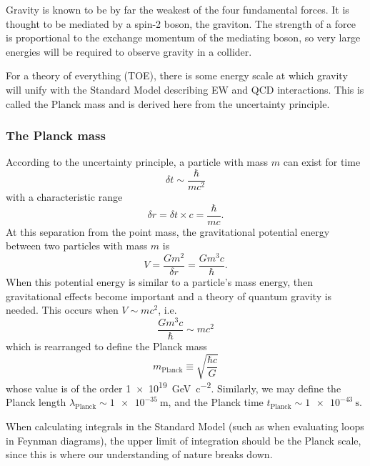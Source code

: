 \documentclass{report}
\begin{document}
Gravity is known to be by far the weakest of the four fundamental forces. It is thought to be mediated by a spin-2 boson, the graviton. The strength of a force is proportional to the exchange momentum of the mediating boson, so very large energies will be required to observe gravity in a collider.

For a theory of everything (TOE), there is some energy scale at which gravity will unify with the Standard Model describing EW and QCD interactions. This is called the Planck mass and is derived here from the uncertainty principle.

\subsubsection{The Planck mass}
According to the uncertainty principle, a particle with mass $m$ can exist for time
\begin{equation}
\delta t \sim \frac{\hbar}{mc^2}
\end{equation}
with a characteristic range
\begin{equation}
\delta r = \delta t \times c = \frac{\hbar}{mc}.
\end{equation}
At this separation from the point mass, the gravitational potential energy between two particles with mass $m$ is
\begin{equation}
V = \frac{Gm^2}{\delta r} = \frac{Gm^3c}{\hbar}.
\end{equation}
When this potential energy is similar to a particle's mass energy, then gravitational effects become important and a theory of quantum gravity is needed. This occurs when $V \sim mc^2$, i.e.~
\begin{equation}
\frac{Gm^3c}{\hbar} \sim mc^2
\end{equation}
which is rearranged to define the Planck mass
\begin{equation}\boxed{
m_\text{Planck} \equiv \sqrt{\frac{\hbar c}{G}}
}
\end{equation}
whose value is of the order \SI[retain-unity-mantissa = false]{1e19}{\giga\electronvolt\per c^2}. Similarly, we may define the Planck length $\lambda_\text{Planck} \sim \SI[retain-unity-mantissa = false]{1e-35}{\meter}$, and the Planck time $t_\text{Planck} \sim \SI[retain-unity-mantissa = false]{1e-43}{\second}$.

When calculating integrals in the Standard Model (such as when evaluating loops in Feynman diagrams), the upper limit of integration should be the Planck scale, since this is where our understanding of nature breaks down.
\end{document}
